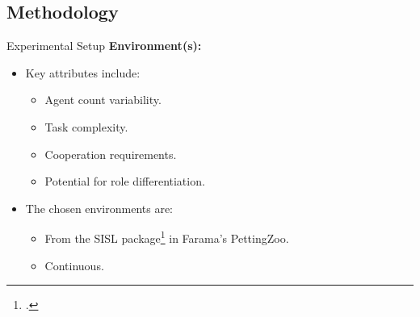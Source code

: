 \subsection{Methodology}


\begin{frame}{Experimental Setup}
    \textbf{Environment(s):}
    \begin{itemize}
        \item Key attributes include:
        \begin{itemize}
            \item Agent count variability.
            \item Task complexity.
            \item Cooperation requirements.
            \item Potential for role differentiation.
        \end{itemize}
        \item The chosen environments are:
        \begin{itemize}
            \item From the SISL package\footcite{gupta2017} in Farama's PettingZoo.
            \item Continuous.
        \end{itemize}
    \end{itemize}
\end{frame}

